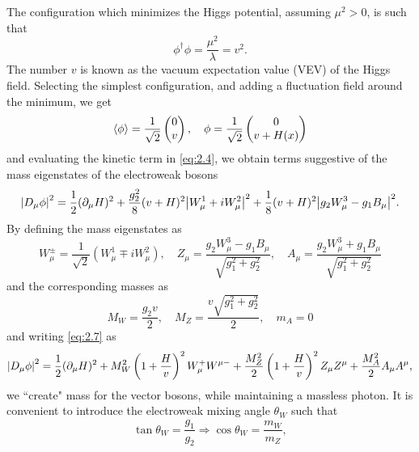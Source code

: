 The configuration which minimizes the Higgs potential, assuming $\mu^2 >0$, is such that 
\begin{equation}
    \label{eq:2.5}
    \phi^{\dagger}\phi = \frac{\mu^2}{\lambda} = v^2.
\end{equation}
The number $v$ is known as the vacuum expectation value (VEV) of the Higgs field. Selecting the simplest configuration, and adding a fluctuation field around the minimum, we get
\begin{equation}
    \label{eq:2.6}
    \expval{\phi} = \frac{1}{\sqrt{2}}\begin{pmatrix}
        0 \\ v
    \end{pmatrix}, \quad \phi = \frac{1}{\sqrt{2}}\begin{pmatrix}
        0 \\ v + H(x)
    \end{pmatrix}
\end{equation}
and evaluating the kinetic term in \eqref{eq:2.4}, we obtain terms suggestive of the mass eigenstates of the electroweak bosons
\begin{equation}
    \label{eq:2.7}
    \abs{D_{\mu}\phi} ^2 = \frac{1}{2}(\partial_{\mu}H)^2 + \frac{g_2^2}{8}(v+H)^2\abs{W_{\mu}^1 + iW_{\mu}^2}^2 + \frac{1}{8}(v+H)^2\abs{g_2W_{\mu}^3-g_1B_{\mu}}^2.
\end{equation}
By defining the mass eigenstates as
\begin{equation}
    \label{eq:2.8}
    W^{\pm}_{\mu}= \frac{1}{\sqrt{2}}(W_{\mu}^1\mp iW_{\mu}^2), \quad Z_{\mu} = \frac{g_2W_{\mu}^3-g_1B_{\mu}}{\sqrt{g_1^2+g_2^2}}, \quad A_{\mu} = \frac{g_2W_{\mu}^3 + g_1B_{\mu}}{\sqrt{g_1^2+g_2^2}}
\end{equation}
and the corresponding masses as
\begin{equation}
    \label{eq:2.9}
    M_W = \frac{g_2v}{2}, \quad M_Z = \frac{v\sqrt{g_1^2+g_2^2}}{2}, \quad m_A = 0
\end{equation}
and writing \eqref{eq:2.7} as
\begin{equation}
    \label{eq:2.10}
    \abs{D_{\mu}\phi} ^2 = \frac{1}{2}(\partial_{\mu}H)^2 + M_W^2\left(1+\frac{H}{v}\right)^2W_{\mu}^{+}W^{\mu-} + \frac{M_Z^2}{2}\left(1+\frac{H}{v}\right)^2Z_{\mu}Z^{\mu} + \frac{M_A^2}{2}A_{\mu}A^{\mu},
\end{equation}
we ``create" mass for the vector bosons, while maintaining a massless photon. It is convenient to introduce the electroweak mixing angle $\theta_W$ such that
\begin{equation}
    \label{eq:2.11}
    \tan\theta_W = \frac{g_1}{g_2} \Rightarrow \cos\theta_W = \frac{m_W}{m_Z}, 
\end{equation}
